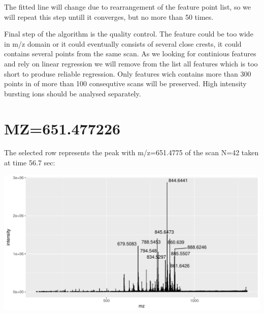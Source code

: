 \documentclass[]{article}
\newenvironment{Shaded}{\begin{snugshade}}{\end{snugshade}}
\newcommand{\KeywordTok}[1]{\textcolor[rgb]{0.13,0.29,0.53}{\textbf{#1}}}
\newcommand{\FloatTok}[1]{\textcolor[rgb]{0.00,0.00,0.81}{#1}}
\newcommand{\OperatorTok}[1]{\textcolor[rgb]{0.81,0.36,0.00}{\textbf{#1}}}
\newcommand{\NormalTok}[1]{#1}
\begin{document}
The fitted line will change due to rearrangement of the feature point
list, so we will repeat this step untill it converges, but no more than
50 times.

Final step of the algorithm is the quality control. The feature could be
too wide in m/z domain or it could eventually consists of several close
crests, it could contains several points from the same scan. As we
looking for continious features and rely on linear regression we will
remove from the list all features which is too short to produse reliable
regression. Only features wich contains more than 300 points in of more
than 100 consequtive scans will be preserved. High intensity bursting
ions should be analysed separately.

\section{MZ=651.477226}\label{mz651.477226}

\begin{Shaded}
\end{Shaded}

The selected row represents the peak with m/z=651.4775 of the scan N=42
taken at time 56.7 sec:

\begin{Shaded}
\end{Shaded}

\includegraphics{Supplementary_document_files/figure-latex/ion.plots.651-1.pdf}
\end{document}
